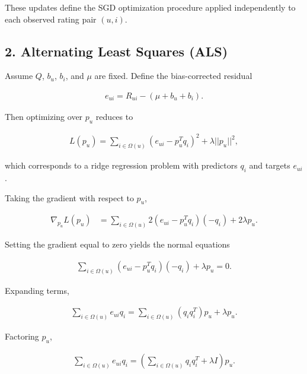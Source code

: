 \documentclass[11pt]{article}
\begin{document}
\begin{appendices}
\noindent These updates define the SGD optimization procedure applied independently to each observed rating pair $(u,i)$.

\vspace{1cm}

\subsection*{2. Alternating Least Squares (ALS)}

\noindent Assume $Q$, $b_u$, $b_i$, and $\mu$ are fixed. Define the bias-corrected residual

\begin{align*}
    e_{ui} = R_{ui} - (\mu + b_u + b_i).
\end{align*}

\noindent Then optimizing over $p_u$ reduces to

\begin{align*}
    L(p_u)
    =
    \sum_{i \in \Omega(u)}
    (e_{ui} - p_u^T q_i)^2
    +
    \lambda ||p_u||^2,
\end{align*}

\noindent which corresponds to a ridge regression problem with predictors $q_i$ and targets $e_{ui}$.

\noindent Taking the gradient with respect to $p_u$,

\begin{align*}
    \nabla_{p_u} L(p_u)
    &=
    \sum_{i \in \Omega(u)}
    2(e_{ui} - p_u^T q_i)(-q_i)
    +
    2\lambda p_u.
\end{align*}

\noindent Setting the gradient equal to zero yields the normal equations

\begin{align*}
    \sum_{i \in \Omega(u)}
    (e_{ui} - p_u^T q_i)(-q_i)
    + \lambda p_u = 0.
\end{align*}

\noindent Expanding terms,

\begin{align*}
    \sum_{i \in \Omega(u)}
    e_{ui} q_i
    =
    \sum_{i \in \Omega(u)}
    (q_i q_i^T)p_u
    +
    \lambda p_u.
\end{align*}

\noindent Factoring $p_u$,

\begin{align*}
    \sum_{i \in \Omega(u)}
    e_{ui} q_i
    =
    \left(
    \sum_{i \in \Omega(u)}
    q_i q_i^T
    +
    \lambda I
    \right)
    p_u.
\end{align*}


\end{appendices}
\end{document}
